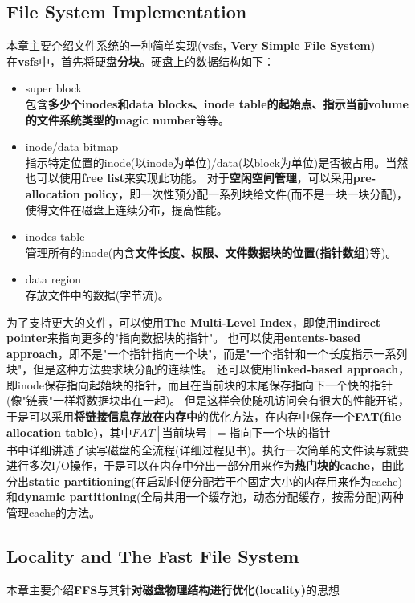 \documentclass{article}
\begin{document}
\subsection{File System Implementation}
本章主要介绍文件系统的一种简单实现(\textbf{vsfs, Very Simple File System}) \\
在\textbf{vsfs}中，首先将硬盘\textbf{分块}。硬盘上的数据结构如下：
\begin{itemize}
    \item super block \\
    包含\textbf{多少个inodes和data blocks、inode table的起始点、指示当前volume的文件系统类型的magic number}等等。
    \item inode/data bitmap \\
    指示特定位置的inode(以inode为单位)/data(以block为单位)是否被占用。当然也可以使用\textbf{free list}来实现此功能。
    对于\textbf{空闲空间管理}，可以采用\textbf{pre-allocation policy}，即一次性预分配一系列块给文件(而不是一块一块分配)，使得文件在磁盘上连续分布，提高性能。
    \item inodes table \\
    管理所有的inode(内含\textbf{文件长度、权限、文件数据块的位置(指针数组)}等)。
    \item data region \\
    存放文件中的数据(字节流)。
\end{itemize}
为了支持更大的文件，可以使用\textbf{The Multi-Level Index}，即使用\textbf{indirect pointer}来指向更多的"指向数据块的指针"。
也可以使用\textbf{entents-based approach}，即不是"一个指针指向一个块"，而是"一个指针和一个长度指示一系列块"，但是这种方法要求块分配的连续性。
还可以使用\textbf{linked-based approach}，即inode保存指向起始块的指针，而且在当前块的末尾保存指向下一个快的指针(像"链表"一样将数据块串在一起)。
但是这样会使随机访问会有很大的性能开销，于是可以采用\textbf{将链接信息存放在内存中}的优化方法，在内存中保存一个\textbf{FAT(file allocation table)}，其中$FAT[\text{当前块号}]=\text{指向下一个块的指针}$ \\
书中详细讲述了读写磁盘的全流程(详细过程见书)。执行一次简单的文件读写就要进行多次I/O操作，于是可以在内存中分出一部分用来作为\textbf{热门块的cache}，由此分出\textbf{static partitioning}(在启动时便分配若干个固定大小的内存用来作为cache)和\textbf{dynamic partitioning}(全局共用一个缓存池，动态分配缓存，按需分配)两种管理cache的方法。
\subsection{Locality and The Fast File System}
本章主要介绍\textbf{FFS}与其\textbf{针对磁盘物理结构进行优化(locality)}的思想
\end{document}
